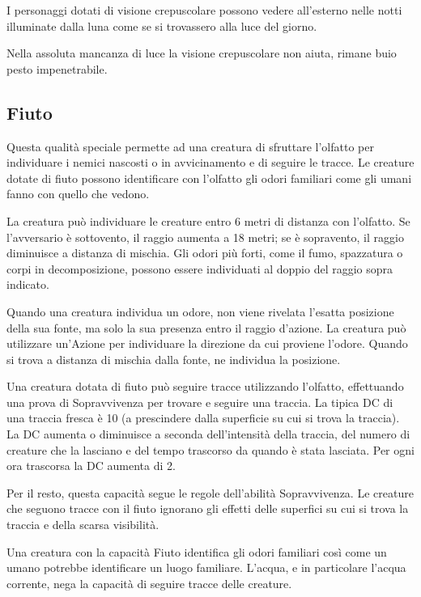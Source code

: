 \documentclass[a4paper,11pt,twoside,openany]{book}
\begin{document}
I personaggi dotati di visione crepuscolare possono vedere all’esterno nelle notti illuminate dalla luna come se si trovassero alla luce del giorno.

Nella assoluta mancanza di luce la visione crepuscolare non aiuta, rimane buio pesto impenetrabile.

\subsection{Fiuto}

Questa qualità speciale permette ad una creatura di sfruttare l'olfatto per individuare i nemici nascosti o in avvicinamento e di seguire le tracce. Le creature dotate di fiuto possono identificare con l'olfatto gli odori familiari come gli umani fanno con quello che vedono.

La creatura può individuare le creature entro 6 metri di distanza con l'olfatto. Se l'avversario è sottovento, il raggio aumenta a 18 metri; se è sopravento, il raggio diminuisce a distanza di mischia.
Gli odori più forti, come il fumo, spazzatura o corpi in decomposizione, possono essere individuati al doppio del raggio sopra indicato.

Quando una creatura individua un odore, non viene rivelata l'esatta posizione della sua fonte, ma solo la sua presenza entro il raggio d'azione. La creatura può utilizzare un'Azione per individuare la direzione da cui proviene l'odore. Quando si trova a distanza di mischia dalla fonte, ne individua la posizione.

Una creatura dotata di fiuto può seguire tracce utilizzando l'olfatto, effettuando una prova di Sopravvivenza per trovare e seguire una traccia. La tipica DC di una traccia fresca è 10 (a prescindere dalla superficie su cui si trova la traccia). La DC aumenta o diminuisce a seconda dell'intensità della traccia, del numero di creature che la lasciano e del tempo trascorso da quando è stata lasciata. Per ogni ora trascorsa la DC aumenta di 2.

Per il resto, questa capacità segue le regole dell'abilità Sopravvivenza. Le creature che seguono tracce con il fiuto ignorano gli effetti delle superfici su cui si trova la traccia e della scarsa visibilità.

Una creatura con la capacità Fiuto identifica gli odori familiari così come un umano potrebbe identificare un luogo familiare. L'acqua, e in particolare l'acqua corrente, nega la capacità di seguire tracce delle creature.
\end{document}
